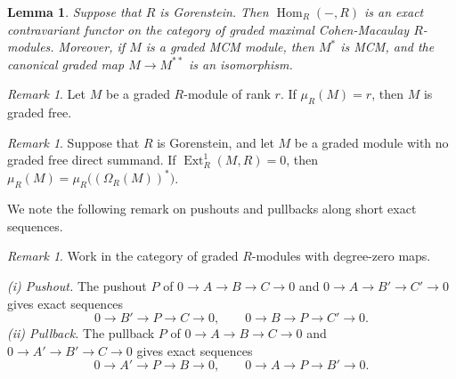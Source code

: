 \documentclass[11pt,letterpaper]{amsart}
\theoremstyle{plain}
\newtheorem{lem}[thm]{Lemma}
\theoremstyle{definition}
\theoremstyle{remark}
\newtheorem{remark}[thm]{Remark}
\begin{document}
\begin{lem}
Suppose that $R$ is Gorenstein. Then $\operatorname{Hom}_R(-,R)$ is an
exact contravariant functor on the category of graded maximal
Cohen-Macaulay $R$-modules. Moreover, if $M$ is a graded MCM module, then
$M^*$ is MCM, and the canonical graded map $M\to M^{**}$ is an isomorphism.
\end{lem}

\begin{remark}
Let $M$ be a graded $R$-module of rank $r$. If $\mu_R(M)=r$, then $M$ is graded free.
\end{remark}

\begin{remark} \label{minimalsyzygydualresolution}
Suppose that $R$ is Gorenstein, and let $M$ be a graded module with no graded free direct summand. If $\operatorname{Ext}^1_R(M,R)=0$,
then $
\mu_R(M)=\mu_R\bigl((\Omega_R(M))^*\bigr)$.
\end{remark}

We note the following remark on pushouts and pullbacks along short exact sequences. 

\begin{remark}
Work in the category of graded $R$-modules with degree-zero maps.

\textit{(i) Pushout.}
The pushout $P$ of $0\to A\to B\to C\to0$ and
$0\to A\to B'\to C'\to0$ gives exact sequences
\[
0\to B'\to P\to C\to0,
\qquad
0\to B\to P\to C'\to0.
\]
\textit{(ii) Pullback.}
The pullback $P$ of $0\to A\to B\to C\to0$ and
$0\to A'\to B'\to C\to0$ gives exact sequences
\[
0\to A'\to P\to B\to0,
\qquad
0\to A\to P\to B'\to0.
\]
\end{remark}
 
\end{document}
